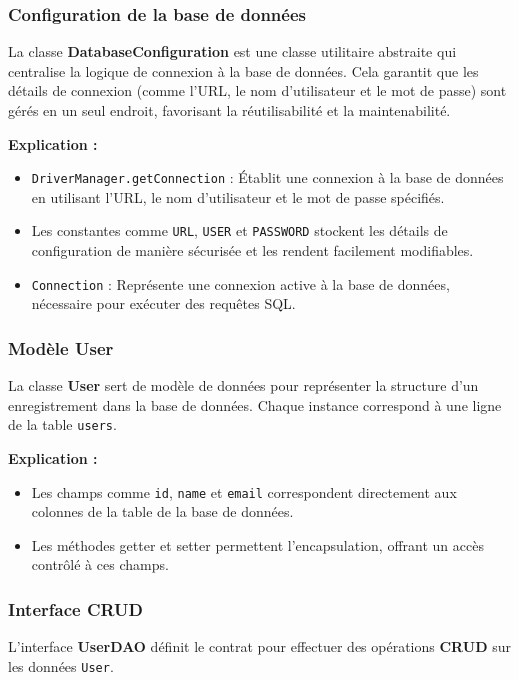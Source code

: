 \documentclass{article}
\begin{document}
\subsubsection{Configuration de la base de données}

La classe \textbf{DatabaseConfiguration} est une classe utilitaire abstraite qui centralise la logique de connexion à la base de données. Cela garantit que les détails de connexion (comme l'URL, le nom d'utilisateur et le mot de passe) sont gérés en un seul endroit, favorisant la réutilisabilité et la maintenabilité.

\textbf{Explication :}
\begin{itemize}
    \item \texttt{DriverManager.getConnection} : Établit une connexion à la base de données en utilisant l'URL, le nom d'utilisateur et le mot de passe spécifiés.
    \item Les constantes comme \texttt{URL}, \texttt{USER} et \texttt{PASSWORD} stockent les détails de configuration de manière sécurisée et les rendent facilement modifiables.
    \item \texttt{Connection} : Représente une connexion active à la base de données, nécessaire pour exécuter des requêtes SQL.
\end{itemize}

\subsubsection{Modèle User}

La classe \textbf{User} sert de modèle de données pour représenter la structure d'un enregistrement dans la base de données. Chaque instance correspond à une ligne de la table \texttt{users}.

\textbf{Explication :}
\begin{itemize}
    \item Les champs comme \texttt{id}, \texttt{name} et \texttt{email} correspondent directement aux colonnes de la table de la base de données.
    \item Les méthodes getter et setter permettent l'encapsulation, offrant un accès contrôlé à ces champs.
\end{itemize}

\subsubsection{Interface CRUD}

L'interface \textbf{UserDAO} définit le contrat pour effectuer des opérations \textbf{CRUD} sur les données \texttt{User}.
\end{document}
